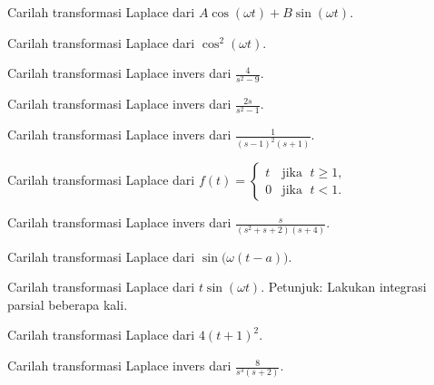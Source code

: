 \begin{exercise}
Carilah transformasi Laplace dari $A \cos (\omega t) + B \sin (\omega t)$.
\end{exercise}

\begin{exercise}
Carilah transformasi Laplace dari $\cos^2 (\omega t)$.
\end{exercise}

\begin{exercise}
Carilah transformasi Laplace invers dari $\frac{4}{s^2-9}$.
\end{exercise}

\begin{exercise}
Carilah transformasi Laplace invers dari $\frac{2s}{s^2-1}$.
\end{exercise}

\begin{exercise}
Carilah transformasi Laplace invers dari $\frac{1}{{(s-1)}^2(s+1)}$.
\end{exercise}

\begin{exercise}
Carilah transformasi Laplace dari $f(t) =
\begin{cases}
t & \text{jika } \; t \geq 1, \\
0 & \text{jika } \; t < 1.
\end{cases}$
\end{exercise}

\begin{exercise}
Carilah transformasi Laplace invers dari $\frac{s}{(s^2+s+2)(s+4)}$.
\end{exercise}

\begin{exercise}
Carilah transformasi Laplace dari $\sin\bigl(\omega (t-a)\bigr)$.
\end{exercise}

\begin{exercise}
Carilah transformasi Laplace dari $t\sin(\omega t)$.  Petunjuk: Lakukan integrasi
parsial beberapa kali.
\end{exercise}

\setcounter{exercise}{100}

\begin{exercise}
Carilah transformasi Laplace dari $4{(t+1)}^2$.
\end{exercise}

\begin{exercise}
Carilah transformasi Laplace invers dari $\frac{8}{s^3(s+2)}$.
\end{exercise}

